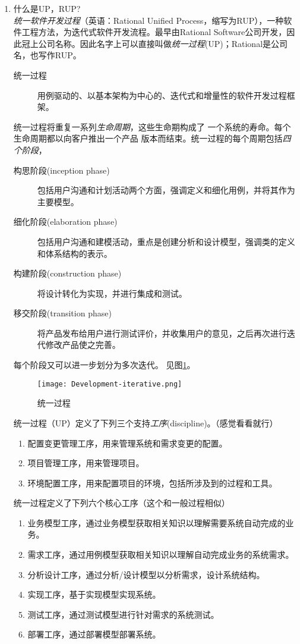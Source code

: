 \documentclass[14pt, letterpaper, UTF8, fontset=windowsnew, heading=true]{article}
\begin{document}
\begin{enumerate}
	\item 什么是UP，RUP? \\
	\emph{统一软件开发过程}（英语：Rational Unified Process，缩写为RUP），一种软件工程方法，为迭代式软件开发流程。最早由Rational Software公司开发，因此冠上公司名称。因此名字上可以直接叫做\emph{统一过程}(UP)；Rational是公司名，也写作RUP。
	\begin{description}
		\item[统一过程] 用例驱动的、以基本架构为中心的、迭代式和增量性的软件开发过程框架。
	\end{description}
	统一过程将重复一系列\emph{生命周期}，这些生命期构成了
	一个系统的寿命。每个生命周期都以向客户推出一个产品
	版本而结束。统一过程的每个周期包括\emph{四个阶段}，
	\begin{description}
		\item[构思阶段(inception phase)] 包括用户沟通和计划活动两个方面，强调定义和细化用例，并将其作为主要模型。
		\item[细化阶段(elaboration phase)] 包括用户沟通和建模活动，重点是创建分析和设计模型，强调类的定义和体系结构的表示。
		\item[构建阶段(construction phase)] 将设计转化为实现，并进行集成和测试。
		\item[移交阶段(transition phase)] 将产品发布给用户进行测试评价，并收集用户的意见，之后再次进行迭代修改产品使之完善。
	\end{description}
	每个阶段又可以进一步划分为多次迭代。
	见图\ref{fig:developmentiterative}。\\
	\begin{figure}[h]
		\centering
		\texttt{[image: Development-iterative.png]}
		\caption{统一过程}
		\label{fig:developmentiterative}
	\end{figure}
	统一过程（UP）定义了下列三个支持\emph{工序}(discipline)。（感觉看看就行）
	\begin{enumerate}
		\item 配置变更管理工序，用来管理系统和需求变更的配置。
		\item 项目管理工序，用来管理项目。
		\item 环境配置工序，用来配置项目的环境，包括所涉及到的过程和工具。
	\end{enumerate}
	统一过程定义了下列六个核心工序（这个和一般过程相似）
	\begin{enumerate}
		\item 业务模型工序，通过业务模型获取相关知识以理解需要系统自动完成的业务。
		\item 需求工序，通过用例模型获取相关知识以理解自动完成业务的系统需求。
		\item 分析设计工序，通过分析/设计模型以分析需求，设计系统结构。
		\item 实现工序，基于实现模型实现系统。
		\item 测试工序，通过测试模型进行针对需求的系统测试。
		\item 部署工序，通过部署模型部署系统。
	\end{enumerate}


\end{enumerate}
\end{document}

